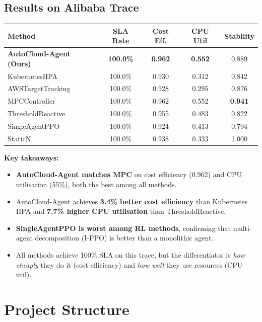 \documentclass[11pt,a4paper]{article}
\begin{document}
\subsection{Results on Alibaba Trace}

\begin{center}
\begin{tabular}{lcccc}
\toprule
\textbf{Method} & \textbf{SLA Rate} & \textbf{Cost Eff.} & \textbf{CPU Util} & \textbf{Stability} \\
\midrule
\textbf{AutoCloud-Agent (Ours)} & \textbf{100.0\%} & \textbf{0.962} & \textbf{0.552} & 0.889 \\
KubernetesHPA       & 100.0\% & 0.930 & 0.312 & 0.842 \\
AWSTargetTracking   & 100.0\% & 0.928 & 0.295 & 0.876 \\
MPCController       & 100.0\% & 0.962 & 0.552 & \textbf{0.941} \\
ThresholdReactive   & 100.0\% & 0.955 & 0.483 & 0.822 \\
SingleAgentPPO      & 100.0\% & 0.924 & 0.413 & 0.794 \\
StaticN             & 100.0\% & 0.938 & 0.333 & 1.000 \\
\bottomrule
\end{tabular}
\end{center}

\medskip
\noindent
\textbf{Key takeaways:}
\begin{itemize}[leftmargin=2em]
  \item \textbf{AutoCloud-Agent matches MPC} on cost efficiency (0.962) and CPU
        utilisation (55\%), both the best among all methods.
  \item AutoCloud-Agent achieves \textbf{3.4\% better cost efficiency} than
        Kubernetes HPA and \textbf{7.7\% higher CPU utilisation} than
        ThresholdReactive.
  \item \textbf{SingleAgentPPO is worst among RL methods}, confirming that
        multi-agent decomposition (I-PPO) is better than a monolithic agent.
  \item All methods achieve 100\% SLA on this trace, but the differentiator is
        \textit{how cheaply} they do it (cost efficiency) and \textit{how well}
        they use resources (CPU util).
\end{itemize}


\section{Project Structure}
\end{document}
